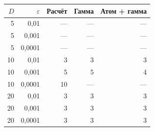 \begin{tabular}{rrrrr}
\hline
$D$ & $\varepsilon$ & Расчёт & Гамма & Атом + гамма \\
\hline
5 & 0,01 & --- & --- & --- \\
5 & 0,001 & --- & --- & --- \\
5 & 0,0001 & --- & --- & --- \\
10 & 0,01 & 3 & 3 & 3 \\
10 & 0,001 & 5 & 5 & 4 \\
10 & 0,0001 & 10 & --- & --- \\
20 & 0,01 & 3 & 3 & 3 \\
20 & 0,001 & 3 & 3 & 3 \\
20 & 0,0001 & 3 & 3 & 3 \\
\hline
\end{tabular}
